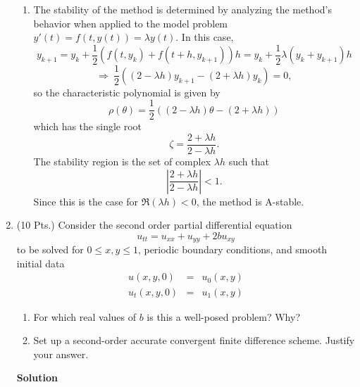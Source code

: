\documentclass{article}
\begin{document}
\begin{enumerate}
\begin{enumerate}
\item The stability of the method is determined by analyzing the method's behavior when applied to the model problem \(y'(t) = f(t,y(t)) = \lambda y(t)\).  In this case,
\[y_{k + 1} = y_k + \frac{1}{2} (f(t,y_k) + f(t + h, y_{k + 1})) h
            = y_k + \frac{1}{2} \lambda (y_k + y_{k + 1}) h\]
\[\Rightarrow \ \frac{1}{2} \left( (2 - \lambda h) y_{k + 1} - (2 + \lambda h) y_k \right) = 0,\]
so the characteristic polynomial is given by
\[\rho(\theta) = \frac{1}{2} \left( (2 - \lambda h) \theta - (2 + \lambda h) \right)\]
which has the single root
\[\zeta = \frac{2 + \lambda h}{2 - \lambda h}.\]
The stability region is the set of complex \(\lambda h\) such that
\[\left| \frac{2 + \lambda h}{2 - \lambda h} \right| < 1.\]
Since this is the case for \(\Re(\lambda h) < 0\), the method is A-stable.

\end{enumerate}



\item (10 Pts.) Consider the second order partial differential equation
\[u_{tt} = u_{xx} + u_{yy} + 2 b u_{xy}\]
to be solved for \(0 \leq x,y \leq 1\), periodic boundary conditions, and smooth initial data
\begin{eqnarray*}
u(x,y,0) & = & u_0(x,y) \\
u_t(x,y,0) & = & u_1(x,y)
\end{eqnarray*}

\begin{enumerate}
\item For which real values of \(b\) is this a well-posed problem?  Why?

\item Set up a second-order accurate convergent finite difference scheme.  Justify your answer.

\end{enumerate}

{\bf Solution}


\end{enumerate}
\end{document}
